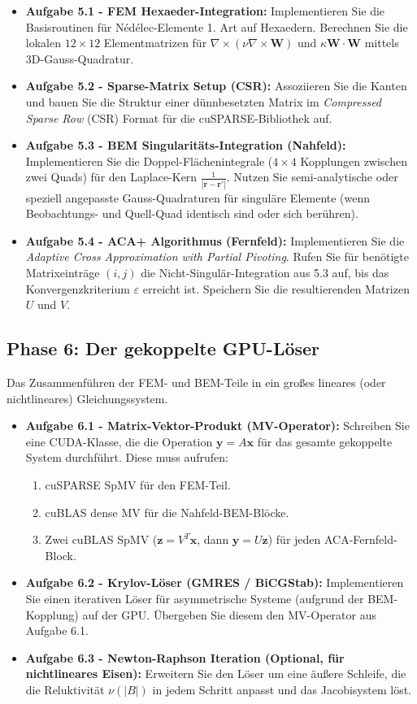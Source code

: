 \documentclass[11pt,a4paper]{article}
\newcommand{\vW}{\bm{W}} %
\newcommand{\rot}{\nabla \times}
\begin{document}
\begin{itemize}
    \item \textbf{Aufgabe 5.1 - FEM Hexaeder-Integration:} Implementieren Sie die Basisroutinen für Nédélec-Elemente 1. Art auf Hexaedern. Berechnen Sie die lokalen $12 \times 12$ Elementmatrizen für $\rot(\nu \rot \vW)$ und $\kappa \vW \cdot \vW$ mittels 3D-Gauss-Quadratur.
    \item \textbf{Aufgabe 5.2 - Sparse-Matrix Setup (CSR):} Assoziieren Sie die Kanten und bauen Sie die Struktur einer dünnbesetzten Matrix im \textit{Compressed Sparse Row} (CSR) Format für die cuSPARSE-Bibliothek auf.
    \item \textbf{Aufgabe 5.3 - BEM Singularitäts-Integration (Nahfeld):} Implementieren Sie die Doppel-Flächenintegrale ($4 \times 4$ Kopplungen zwischen zwei Quads) für den Laplace-Kern $\frac{1}{|\bm{r}-\bm{r}'|}$. Nutzen Sie semi-analytische oder speziell angepasste Gauss-Quadraturen für singuläre Elemente (wenn Beobachtungs- und Quell-Quad identisch sind oder sich berühren).
    \item \textbf{Aufgabe 5.4 - ACA+ Algorithmus (Fernfeld):} Implementieren Sie die \textit{Adaptive Cross Approximation with Partial Pivoting}. Rufen Sie für benötigte Matrixeinträge $(i,j)$ die Nicht-Singulär-Integration aus 5.3 auf, bis das Konvergenzkriterium $\varepsilon$ erreicht ist. Speichern Sie die resultierenden Matrizen $U$ und $V$.
\end{itemize}

\subsection{Phase 6: Der gekoppelte GPU-Löser}
Das Zusammenführen der FEM- und BEM-Teile in ein großes lineares (oder nichtlineares) Gleichungssystem.

\begin{itemize}
    \item \textbf{Aufgabe 6.1 - Matrix-Vektor-Produkt (MV-Operator):} Schreiben Sie eine CUDA-Klasse, die die Operation $\bm{y} = A\bm{x}$ für das gesamte gekoppelte System durchführt. Diese muss aufrufen:
    \begin{enumerate}
        \item cuSPARSE SpMV für den FEM-Teil.
        \item cuBLAS dense MV für die Nahfeld-BEM-Blöcke.
        \item Zwei cuBLAS SpMV ($\bm{z} = V^T \bm{x}$, dann $\bm{y} = U \bm{z}$) für jeden ACA-Fernfeld-Block.
    \end{enumerate}
    \item \textbf{Aufgabe 6.2 - Krylov-Löser (GMRES / BiCGStab):} Implementieren Sie einen iterativen Löser für asymmetrische Systeme (aufgrund der BEM-Kopplung) auf der GPU. Übergeben Sie diesem den MV-Operator aus Aufgabe 6.1.
    \item \textbf{Aufgabe 6.3 - Newton-Raphson Iteration (Optional, für nichtlineares Eisen):} Erweitern Sie den Löser um eine äußere Schleife, die die Reluktivität $\nu(|B|)$ in jedem Schritt anpasst und das Jacobisystem löst.
\end{itemize}
\end{document}
